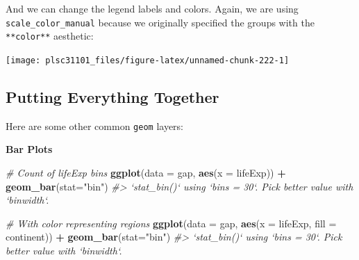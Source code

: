 \documentclass[]{book}
\newenvironment{Shaded}{\begin{snugshade}}{\end{snugshade}}
\newcommand{\KeywordTok}[1]{\textcolor[rgb]{0.13,0.29,0.53}{\textbf{#1}}}
\newcommand{\DataTypeTok}[1]{\textcolor[rgb]{0.13,0.29,0.53}{#1}}
\newcommand{\StringTok}[1]{\textcolor[rgb]{0.31,0.60,0.02}{#1}}
\newcommand{\CommentTok}[1]{\textcolor[rgb]{0.56,0.35,0.01}{\textit{#1}}}
\newcommand{\OperatorTok}[1]{\textcolor[rgb]{0.81,0.36,0.00}{\textbf{#1}}}
\newcommand{\NormalTok}[1]{#1}
\begin{document}
And we can change the legend labels and colors. Again, we are using
\texttt{scale\_color\_manual} because we originally specified the groups
with the \texttt{**color**} aesthetic:

\begin{Shaded}
\end{Shaded}

\begin{center}\texttt{[image: plsc31101\_files/figure-latex/unnamed-chunk-222-1]} \end{center}

\subsection{Putting Everything
Together}\label{putting-everything-together}

Here are some other common \texttt{geom} layers:

\textbf{Bar Plots}

\begin{Shaded}
\begin{Highlighting}[]
\CommentTok{# Count of lifeExp bins}
\KeywordTok{ggplot}\NormalTok{(}\DataTypeTok{data =}\NormalTok{ gap, }\KeywordTok{aes}\NormalTok{(}\DataTypeTok{x =}\NormalTok{ lifeExp)) }\OperatorTok{+}\StringTok{ }
\StringTok{  }\KeywordTok{geom_bar}\NormalTok{(}\DataTypeTok{stat=}\StringTok{"bin"}\NormalTok{)}
\CommentTok{#> `stat_bin()` using `bins = 30`. Pick better value with `binwidth`.}

\CommentTok{# With color representing regions}
\KeywordTok{ggplot}\NormalTok{(}\DataTypeTok{data =}\NormalTok{ gap, }\KeywordTok{aes}\NormalTok{(}\DataTypeTok{x =}\NormalTok{ lifeExp, }\DataTypeTok{fill =}\NormalTok{ continent)) }\OperatorTok{+}\StringTok{ }
\StringTok{  }\KeywordTok{geom_bar}\NormalTok{(}\DataTypeTok{stat=}\StringTok{"bin"}\NormalTok{)}
\CommentTok{#> `stat_bin()` using `bins = 30`. Pick better value with `binwidth`.}
\end{Highlighting}
\end{Shaded}
\end{document}
